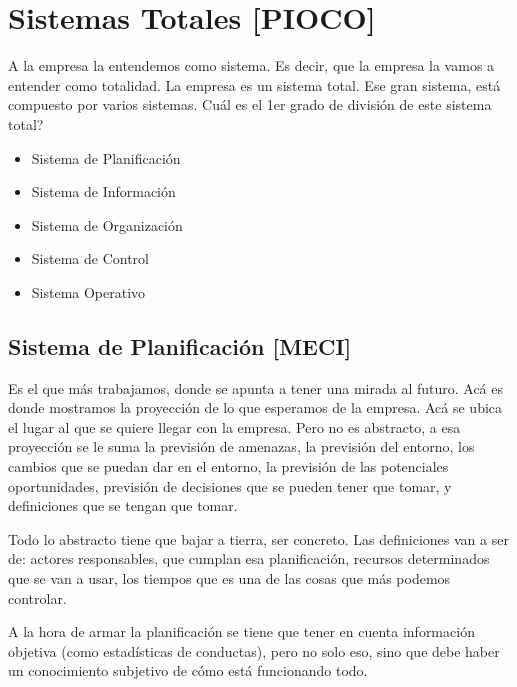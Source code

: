 
\hypertarget{sistemas-totales-pioco}{%
\section{Sistemas Totales {[}PIOCO{]}}\label{sistemas-totales-pioco}}

A la empresa la entendemos como sistema. Es decir, que la empresa la
vamos a entender como totalidad. La empresa es un sistema total. Ese
gran sistema, está compuesto por varios sistemas. Cuál es el 1er grado
de división de este sistema total?

\begin{itemize}
\item
  Sistema de Planificación
\item
  Sistema de Información
\item
  Sistema de Organización
\item
  Sistema de Control
\item
  Sistema Operativo
\end{itemize}

\hypertarget{sistema-de-planificaciuxf3n-meci}{%
\subsection{Sistema de Planificación
{[}MECI{]}}\label{sistema-de-planificaciuxf3n-meci}}

Es el que más trabajamos, donde se apunta a tener una mirada al futuro.
Acá es donde mostramos la proyección de lo que esperamos de la empresa.
Acá se ubica el lugar al que se quiere llegar con la empresa. Pero no es
abstracto, a esa proyección se le suma la previsión de amenazas, la
previsión del entorno, los cambios que se puedan dar en el entorno, la
previsión de las potenciales oportunidades, previsión de decisiones que
se pueden tener que tomar, y definiciones que se tengan que tomar.

Todo lo abstracto tiene que bajar a tierra, ser concreto. Las
definiciones van a ser de: actores responsables, que cumplan esa
planificación, recursos determinados que se van a usar, los tiempos que
es una de las cosas que más podemos controlar.

A la hora de armar la planificación se tiene que tener en cuenta
información objetiva (como estadísticas de conductas), pero no solo eso,
sino que debe haber un conocimiento subjetivo de cómo está funcionando
todo.

